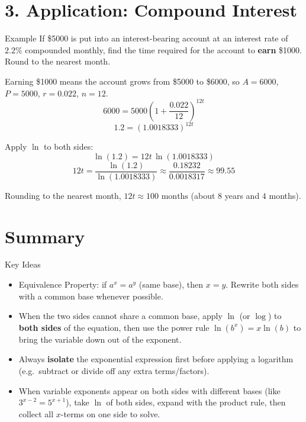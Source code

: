 \documentclass[12pt]{article}
\newcounter{examplenum}
\newenvironment{friendlyex}{%
    \refstepcounter{examplenum}%
    \begin{friendlyexbox}{Example \theexamplenum}%
}{%
    \end{friendlyexbox}%
}
\begin{document}
\section*{3. Application: Compound Interest}

\begin{friendlyex}{}
If \$5000 is put into an interest-bearing account at an interest rate of $2.2\%$ compounded monthly, find the time required for the account to \textbf{earn} \$1000. Round to the nearest month.
\end{friendlyex}

\begin{solutionbox}
Earning \$1000 means the account grows from \$5000 to \$6000, so $A=6000$, $P=5000$, $r=0.022$, $n=12$.
\[
6000=5000\left(1+\frac{0.022}{12}\right)^{12t}
\]
\[
1.2=\left(1.0018333\right)^{12t}
\]

Apply $\ln$ to both sides:
\[
\ln(1.2)=12t\,\ln(1.0018333)
\]
\[
12t=\frac{\ln(1.2)}{\ln(1.0018333)}\approx\frac{0.18232}{0.0018317}\approx99.55
\]

Rounding to the nearest month, $12t\approx \boxed{100 \text{ months}}$ (about $8$ years and $4$ months).
\end{solutionbox}

\section*{Summary}

\begin{friendlyrule}{Key Ideas}
\begin{itemize}
    \item Equivalence Property: if $a^x=a^y$ (same base), then $x=y$. Rewrite both sides with a common base whenever possible.
    \item When the two sides cannot share a common base, apply $\ln$ (or $\log$) to \textbf{both sides} of the equation, then use the power rule $\ln(b^x)=x\ln(b)$ to bring the variable down out of the exponent.
    \item Always \textbf{isolate} the exponential expression first before applying a logarithm (e.g.\ subtract or divide off any extra terms/factors).
    \item When variable exponents appear on both sides with different bases (like $3^{x-2}=5^{x+1}$), take $\ln$ of both sides, expand with the product rule, then collect all $x$-terms on one side to solve.
\end{itemize}
\end{friendlyrule}
\end{document}
